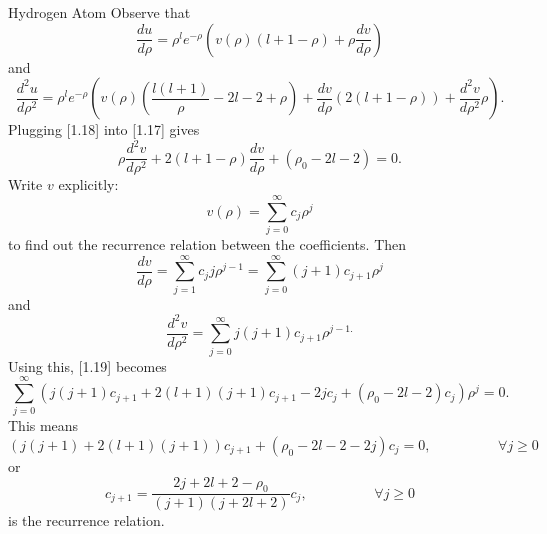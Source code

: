 \documentclass[phys334]{subfiles}
\begin{document}
\begin{example}{Hydrogen Atom}
        Observe that
        \begin{equation*}
            \frac{du}{d\rho} = \rho^le^{-\rho}\left( v\left( \rho \right)\left( l+1-\rho \right)+\rho \frac{dv}{d\rho} \right)
        \end{equation*}
        and
        \begin{equation}
            \frac{d^{2}u}{d\rho^{2}} = \rho^le^{-\rho}\left( v\left( \rho \right)\left( \frac{l\left( l+1 \right)}{\rho}-2l-2+\rho \right)+\frac{dv}{d\rho}\left( 2\left( l+1-\rho \right) \right)+\frac{d^{2}v}{d\rho^{2}}\rho \right).
        \end{equation}
        Plugging [1.18] into [1.17] gives
        \begin{equation}
            \rho \frac{d^{2}v}{d\rho^{2}} + 2\left( l+1-\rho \right) \frac{dv}{d\rho} + \left( \rho_0-2l-2 \right) = 0.
        \end{equation}
        Write $v$ explicitly:
        \begin{equation*}
            v\left( \rho \right) = \sum^{\infty}_{j=0}c_j\rho^j
        \end{equation*}
        to find out the recurrence relation between the coefficients. Then
        \begin{equation*}
            \frac{dv}{d\rho} = \sum^{\infty}_{j=1} c_jj\rho^{j-1} = \sum^{\infty}_{j=0} \left( j+1 \right)c_{j+1}\rho^j
        \end{equation*} 
        and
        \begin{equation*}
            \frac{d^{2}v}{d\rho^{2}} = \sum^{\infty}_{j=0} j\left( j+1 \right)c_{j+1}\rho^{j-1.}
        \end{equation*}
        Using this, [1.19] becomes
        \begin{equation}
            \sum^{\infty}_{j=0} \left( j\left( j+1 \right)c_{j+1}+2\left( l+1 \right)\left( j+1 \right)c_{j+1}-2jc_j+\left( \rho_0-2l-2 \right)c_j \right)\rho^j = 0.
        \end{equation}
        This means
        \begin{equation}
            \left( j\left( j+1 \right)+2\left( l+1 \right)\left( j+1 \right) \right)c_{j+1} + \left( \rho_0-2l-2-2j \right)c_j = 0, \hspace{2cm}\forall j\geq 0
        \end{equation}
        or
        \begin{equation*}
            c_{j+1} = \frac{2j+2l+2-\rho_0}{\left( j+1 \right)\left( j+2l+2 \right)} c_j, \hspace{2cm}\forall j\geq 0
        \end{equation*}
        is the recurrence relation. 


\end{example}
\end{document}
